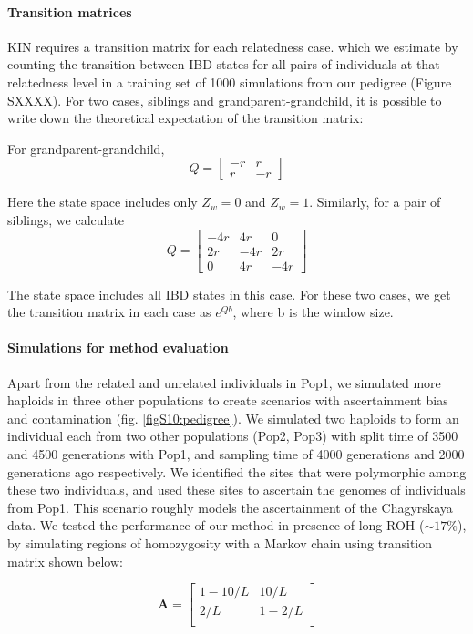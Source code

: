 \documentclass[12pt, letterpaper]{article}
\begin{document}
\paragraph{Transition matrices}
KIN requires a transition matrix for each relatedness case. which we estimate  by counting the transition between IBD states for all pairs of individuals at that relatedness level in a training set of 1000 simulations from our pedigree (Figure SXXXX). For two cases, siblings and grandparent-grandchild, it is possible to write down the theoretical expectation of the transition matrix: 

For grandparent-grandchild, 
 $$Q = \left[\begin{array}
{rrr}
-r & r \\
r & -r 
\end{array}\right]$$   

Here the state space includes only $Z_w=0$ and $Z_w=1$. 
Similarly, for a pair of siblings, we calculate $$Q =  
\left[\begin{array}
{rrr}
-4r & 4r & 0\\
2r & -4r & 2r\\
0 & 4r & -4r
\end{array}\right]$$   

The state space includes all IBD states in this case. For these two cases, we get the transition matrix in each case as $e^{Qb}$, where b is the window size.


\paragraph{Simulations for method evaluation}
Apart from the related and unrelated individuals in Pop1, we simulated more haploids in three other populations to create scenarios with ascertainment bias and contamination (fig. \ref{figS10:pedigree}). We simulated two haploids to form an individual each from two other populations (Pop2, Pop3) with split time of 3500 and 4500 generations with Pop1, and sampling time of 4000 generations and 2000 generations ago respectively.  We identified the sites that were polymorphic among these two individuals, and used these sites to ascertain the genomes of individuals from Pop1. This scenario roughly models the ascertainment of the Chagyrskaya  data. We tested the performance of our method in presence of long ROH ($\sim17\%$), by simulating regions of homozygosity with a Markov chain using transition matrix shown below: 

$$\mathbf{A} = \left[\begin{array}
{rr}
1-10/L & 10/L \\
2/L & 1-2/L  \\
\end{array}\right]
$$
\end{document}
